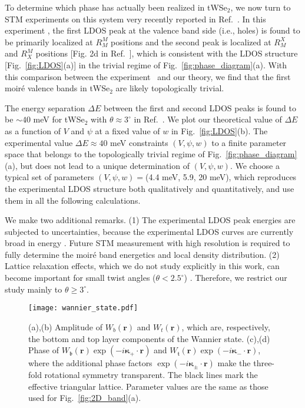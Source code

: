 \documentclass[aps,prx,floatfix,twocolumn]{revtex4-1}
\begin{document}
	To determine which phase has actually been realized in tWSe$_2$, we now turn to STM experiments on this system very recently reported in Ref.~. In this experiment \cite{zhang2020flat}, the first LDOS peak at the valence band side (i.e., holes) is found to be primarily localized at $ R_M^M $ positions and the second peak is localized at $R_M^X $ and $ R_X^M $ positions [Fig. 2d in Ref.~], which is consistent with the LDOS structure [Fig.~\ref{fig:LDOS}(a)] in the trivial regime of Fig.~\ref{fig:phase_diagram}(a). With this comparison between the experiment~\cite{zhang2020flat} and our theory, we find that the first moir\'e valence bands in tWSe$_2$ are likely topologically trivial. 
	
	The energy separation $\Delta E$ between the first and second LDOS peaks is found to be $\sim 40$ meV for tWSe$_2$ with $\theta\approx 3^{\circ}$ in Ref.~.  We plot our theoretical value of $\Delta E$ as a function of $V$ and $\psi$ at a fixed value of $w$ in Fig.~\ref{fig:LDOS}(b). The experimental value $\Delta E \approx 40 $ meV constraints $(V,\psi, w)$ to a finite parameter space that belongs to the topologically trivial regime of Fig.~\ref{fig:phase_diagram}(a), but does not lead to a unique determination of $(V,\psi, w)$. We choose a typical set of parameters $ (V,\psi,w)= $(4.4 meV, 5.9, 20 meV), which reproduces the experimental LDOS structure both qualitatively and quantitatively, and use them in all the following calculations.
	
	We make two additional remarks. (1) The experimental LDOS peak energies are subjected to uncertainties, because the experimental LDOS curves are currently broad in energy \cite{zhang2020flat}. Future STM measurement with high resolution is required to fully determine the moir\'e band energetics and local density distribution.  (2) Lattice relaxation effects, which we do not study explicitly in this work, can become important for small twist angles ($\theta < 2.5^{\circ}$) \cite{enaldiev2020stacking}. Therefore, we restrict our study mainly to $\theta \ge 3^{\circ}$.
	

	
	\begin{figure}[t]
		\centering
		\texttt{[image: wannier\_state.pdf]}
		\caption{ (a),(b) Amplitude of $W_b(\bm{r})$ and $W_t(\bm{r})$, which are, respectively, the bottom and top layer components of the Wannier state. (c),(d) Phase of $W_\mathfrak{b}(\bm{r})\exp(-i \bm{\kappa}_+ \cdot \bm{r})$ and $W_\mathfrak{t}(\bm{r})\exp(-i \bm{\kappa}_- \cdot \bm{r})$, where the additional phase factors $\exp(-i \bm{\kappa}_{\pm} \cdot \bm{r})$ make the three-fold rotational symmetry transparent. The black lines mark the effective triangular lattice. Parameter values are the same as those used for Fig.~\ref{fig:2D_band}(a).}
		\label{fig:wannier}
	\end{figure}
	
\end{document}
